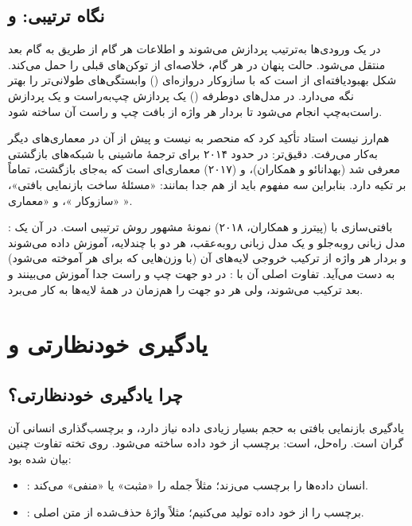 \subsection{نگاه ترتیبی:  و }
در یک  ورودی‌ها به‌ترتیب پردازش می‌شوند و اطلاعات هر گام از طریق  به گام بعد منتقل می‌شود. حالت پنهان در هر گام، خلاصه‌ای از توکن‌های قبلی را حمل می‌کند.  شکل بهبودیافته‌ای از  است که با سازوکار دروازه‌ای () وابستگی‌های طولانی‌تر را بهتر نگه می‌دارد. در مدل‌های دوطرفه () یک پردازش چپ‌به‌راست و یک پردازش راست‌به‌چپ انجام می‌شود تا بردار هر واژه از بافت چپ و راست آن ساخته شود.

\begin{correctionbox}{ هم‌ارز  نیست}
استاد تأکید کرد که  منحصر به  نیست و پیش از آن در معماری‌های دیگر به‌کار می‌رفت. دقیق‌تر:  در حدود ۲۰۱۴ برای ترجمهٔ ماشینی با شبکه‌های بازگشتی معرفی شد (بهدانائو و همکاران)، و  (۲۰۱۷) معماری‌ای است که به‌جای بازگشت، تماماً بر  تکیه دارد. بنابراین سه مفهوم باید از هم جدا بمانند: «مسئلهٔ ساخت بازنمایی بافتی»، «سازوکار »، و «معماری ».
\end{correctionbox}

\begin{addedbox}{: بافتی‌سازی با }
 (پیترز و همکاران، ۲۰۱۸) نمونهٔ مشهور روش ترتیبی است. در آن یک مدل زبانی رو‌به‌جلو و یک مدل زبانی رو‌به‌عقب، هر دو با  چندلایه، آموزش داده می‌شوند و بردار هر واژه از ترکیب خروجی لایه‌های آن (با وزن‌هایی که برای هر  آموخته می‌شود) به دست می‌آید. تفاوت اصلی آن با : در  دو جهت چپ و راست جدا آموزش می‌بینند و بعد ترکیب می‌شوند، ولی  هر دو جهت را هم‌زمان در همهٔ لایه‌ها به کار می‌برد.
\end{addedbox}

\section{یادگیری خودنظارتی و }

\subsection{چرا یادگیری خودنظارتی؟}
یادگیری بازنمایی بافتی به حجم بسیار زیادی داده نیاز دارد، و برچسب‌گذاری انسانی آن گران است. راه‌حل،  است: برچسب از خود داده ساخته می‌شود. روی تخته تفاوت چنین بیان شده بود:
\begin{itemize}
  \item {}: انسان داده‌ها را برچسب می‌زند؛ مثلاً جمله را «مثبت» یا «منفی» می‌کند.
  \item {}: برچسب را از خود داده تولید می‌کنیم؛ مثلاً واژهٔ حذف‌شده از متن اصلی.
\end{itemize}

